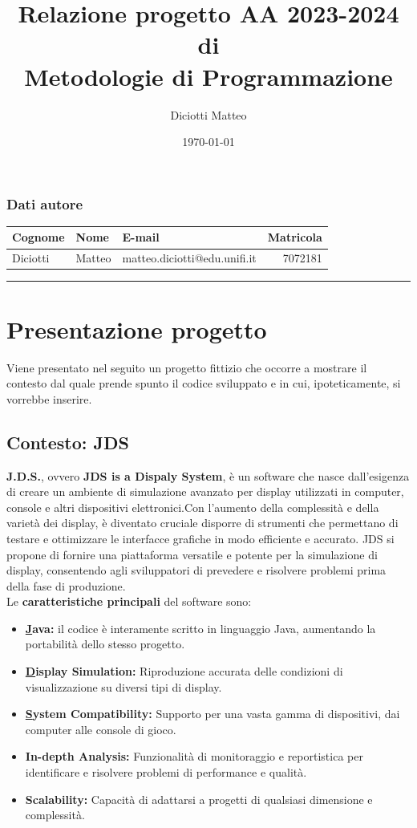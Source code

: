 \documentclass[a4paper,11pt]{article}
\author{Diciotti Matteo}
\title{Relazione progetto AA 2023-2024 di\\ \textbf{Metodologie di Programmazione}}
\date{\today}
\begin{document}
	
	\maketitle
	
	\subsubsection*{Dati autore}
	\begin{tabularx}{\textwidth}{l l >{\raggedleft\arraybackslash}X r}
		\textbf{Cognome} & \textbf{Nome} & \textbf{E-mail} & \textbf{Matricola}\\\toprule
		Diciotti & Matteo & matteo.diciotti@edu.unifi.it & 7072181
	\end{tabularx}
	
	\tableofcontents
	\vspace{1em}\noindent\rule{\textwidth}{2pt}
	
	\section{Presentazione progetto}
	Viene presentato nel seguito un progetto fittizio che occorre a mostrare il contesto dal quale prende spunto il codice sviluppato e in cui, ipoteticamente, si vorrebbe inserire.
	\subsection{Contesto: JDS} \label{jds}
	\textbf{J.D.S.}, ovvero \textbf{JDS is a Dispaly System}, è un software che nasce dall’esigenza di creare un ambiente di simulazione avanzato per display utilizzati in computer, console e altri dispositivi elettronici.Con l’aumento della complessità e della varietà dei display, è diventato cruciale disporre di strumenti che permettano di testare e ottimizzare le interfacce grafiche in modo efficiente e accurato. JDS si propone di fornire una piattaforma versatile e potente per la simulazione di display, consentendo agli sviluppatori di prevedere e risolvere problemi prima della fase di produzione.\\
	Le \textbf{caratteristiche principali} del software sono:
	\begin{itemize}\setlength\itemsep{-3pt}		
		\item \textbf{\underline{J}ava:} il codice è interamente scritto in linguaggio Java, aumentando la portabilità dello stesso progetto.
		\item \textbf{\underline{D}isplay Simulation:} Riproduzione accurata delle condizioni di visualizzazione su diversi tipi di display.
		\item \textbf{\underline{S}ystem Compatibility:} Supporto per una vasta gamma di dispositivi, dai computer alle console di gioco.
		\item \textbf{In-depth Analysis:} Funzionalità di monitoraggio e reportistica per identificare e risolvere problemi di performance e qualità.
		\item \textbf{Scalability:} Capacità di adattarsi a progetti di qualsiasi dimensione e complessità.
	\end{itemize}	
\end{document}

